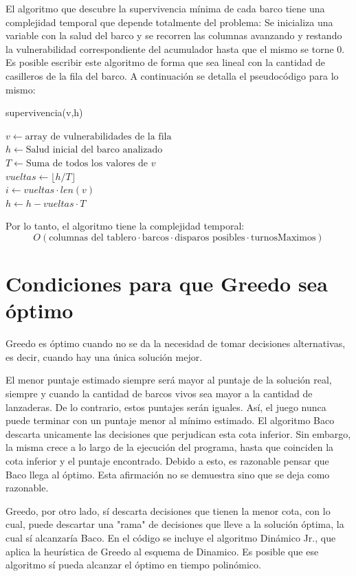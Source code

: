 \documentclass{article}
\begin{document}
El algoritmo que descubre la supervivencia mínima de cada barco tiene una complejidad temporal que depende totalmente del problema: Se inicializa una variable con la salud del barco y se recorren las columnas avanzando y restando la vulnerabilidad correspondiente del acumulador hasta que el mismo se torne 0. Es posible escribir este algoritmo de forma que sea lineal con la cantidad de casilleros de la fila del barco. A continuación se detalla el pseudocódigo para lo mismo:

\begin{algorithm}
\caption{supervivencia(v,h)}
    $v \leftarrow \text{array de vulnerabilidades de la fila}$ \\
    $h \leftarrow \text{Salud inicial del barco analizado}$ \\
    
    
    $T \leftarrow \text{Suma de todos los valores de } v$ \\
    $vueltas \leftarrow \lfloor h / T \rfloor $ \\
    $i \leftarrow vueltas \cdot len(v)$ \\
    $h \leftarrow h-vueltas \cdot T$ \\
    
    
    
\end{algorithm}

Por lo tanto, el algoritmo tiene la complejidad temporal:
$$O(\text{columnas del tablero} \cdot \text{barcos}  \cdot \text{disparos posibles} \cdot \text{turnosMaximos})$$


\section{Condiciones para que Greedo sea óptimo}
Greedo es óptimo cuando no se da la necesidad de tomar decisiones alternativas, es decir, cuando hay una única solución mejor. 

El menor puntaje estimado siempre será mayor al puntaje de la solución real, siempre y cuando la cantidad de barcos vivos sea mayor a la cantidad de lanzaderas. De lo contrario, estos puntajes serán iguales. Así, el juego nunca puede terminar con un puntaje menor al mínimo estimado. El algoritmo Baco descarta unicamente las decisiones que perjudican esta cota inferior. Sin embargo, la misma crece a lo largo de la ejecución del programa, hasta que coinciden la cota inferior y el puntaje encontrado. Debido a esto, es razonable pensar que Baco llega al óptimo. Esta afirmación no se demuestra sino que se deja como razonable.

Greedo, por otro lado, sí descarta decisiones que tienen la menor cota, con lo cual, puede descartar una "rama" de decisiones que lleve a la solución óptima, la cual sí alcanzaría Baco. En el código se incluye el algoritmo Dinámico Jr., que aplica la heurística de Greedo al esquema de Dinamico. Es posible que ese algoritmo sí pueda alcanzar el óptimo en tiempo polinómico.
\end{document}
